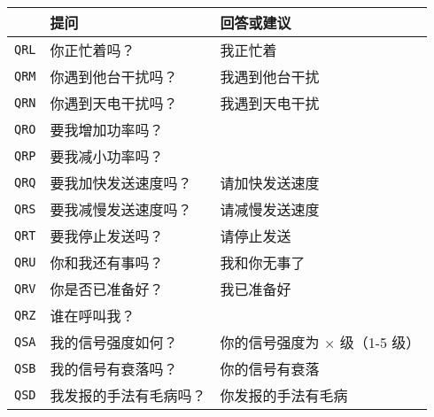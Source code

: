 \begin{longtable}{|l|l|l|}
  \hline
                                  & \textbf{提问}                           & \textbf{回答或建议}                        \\
  \hline
  \texttt{QRL}                    & 你正忙着吗？                                & 我正忙着                                  \\
  \hline
  \texttt{QRM}                    & 你遇到他台干扰吗？                             & 我遇到他台干扰                               \\
  \hline
  \texttt{QRN}                    & 你遇到天电干扰吗？                             & 我遇到天电干扰                               \\
  \hline
  \texttt{QRO}                    & 要我增加功率吗？                              &                                       \\
  \hline
  \texttt{QRP}                    & 要我减小功率吗？                              &                                       \\
  \hline
  \texttt{QRQ}                    & 要我加快发送速度吗？                            & 请加快发送速度                               \\
  \hline
  \texttt{QRS}                    & 要我减慢发送速度吗？                            & 请减慢发送速度                               \\
  \hline
  \texttt{QRT}                    & 要我停止发送吗？                              & 请停止发送                                 \\
  \hline
  \texttt{QRU}                    & 你和我还有事吗？                              & 我和你无事了                                \\
  \hline
  \texttt{QRV}                    & 你是否已准备好？                              & 我已准备好                                 \\
  \hline
  \texttt{QRZ}                    & 谁在呼叫我？                                &                                       \\
  \hline
  \texttt{QSA}                    & 我的信号强度如何？                             & 你的信号强度为 × 级（1-5 级）                    \\
  \hline
  \texttt{QSB}                    & 我的信号有衰落吗？                             & 你的信号有衰落                               \\
  \hline
  \texttt{QSD}                    & 我发报的手法有毛病吗？                           & 你发报的手法有毛病                             \\

\end{longtable}
